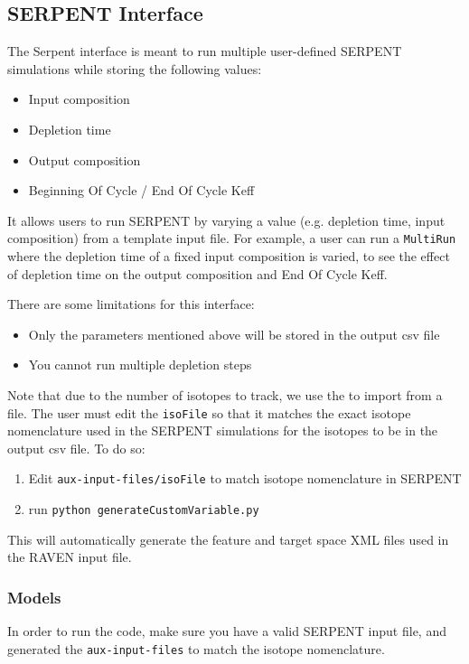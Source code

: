 
\subsection{SERPENT Interface}
\label{subsec:serpentInterface}
The Serpent interface is meant to run multiple user-defined SERPENT simulations
while storing the following values: 
\begin{itemize}
\item Input composition
\item Depletion time
\item Output composition
\item Beginning Of Cycle / End Of Cycle Keff
\end{itemize}

It allows users to run SERPENT by varying a value
(e.g. depletion time, input composition) from a template input file.
For example, a user can run a \texttt{MultiRun} where the depletion
time of a fixed input composition is varied, to see the effect of
depletion time on the output composition and End Of Cycle Keff.

There are some limitations for this interface:
\begin{itemize}
\item Only the parameters mentioned above will be stored in the output csv file
\item You cannot run multiple depletion steps
\end{itemize}

Note that due to the number of isotopes to track,
we use the  to import from a file.
The user must edit the \texttt{isoFile} so that it
matches the exact isotope nomenclature used in the SERPENT simulations for the isotopes
to be in the output csv file. To do so:

\begin{enumerate}
\item Edit \texttt{aux-input-files/isoFile} to match isotope nomenclature in SERPENT
\item run \texttt{python generateCustomVariable.py}
\end{enumerate}

This will automatically generate the feature and target space XML files
used in the RAVEN input file.


\subsubsection{Models}
In order to run the code, make sure you have a valid SERPENT input file,
and generated the \texttt{aux-input-files} to match the isotope nomenclature.

